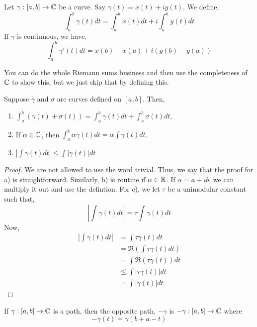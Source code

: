 \documentclass[12pt]{amsart}
\begin{document}
\begin{definition}
    Let $\gamma: [a, b] \to \mathbb C$ be a curve. Say $\gamma(t) = x(t)+iy(t)$. We define, 
    \[ \int_{a}^b \gamma(t)dt = \int_{a}^b x(t)dt + i\int_a^b y(t)dt\]    
    If $\gamma$ is continuous, we have, 
    \[ \int_{a}^b \gamma'(t)dt = x(b)-x(a) +i(y(b)-y(a))\]    
\end{definition}
\begin{remark}
    You can do the whole Riemann sums business and then use the completeness of $\mathbb C$ to show this, but we just skip that by defining this. 
\end{remark}

\begin{proposition}
    Suppose $\gamma$ and $\sigma$ are curves defined on $[a,b]$. Then, 
    \begin{enumerate}
        \item[a)] $\int_a^b (\gamma(t) + \sigma(t))  = \int_a^b \gamma(t)dt + \int_a^b \sigma(t)dt$.
        \item[b)] If $\alpha \in \mathbb C$, then $\int_a^b \alpha\gamma(t)dt = \alpha \int \gamma(t)dt$. 
        \item[c)] $\left| \int \gamma(t)dt\right|  \leq \int|\gamma(t)|dt$
    \end{enumerate}
\end{proposition}
\begin{proof}
    We are not allowed to use the word trivial. Thus, we say that the proof for a) is straightforward. Similarly, b) is routine if $\alpha \in \mathbb R$. If $\alpha = a+ib$, we can multiply it out and use the defintion. For c), we let $\tau$ be a unimodular constant such that,
    \[ |\int \gamma(t)dt| = \tau \int \gamma(t)dt \]
    Now, 
    \begin{align*}
        \left|\int \gamma(t) dt \right| &= \int \tau \gamma(t)dt \\
        &= \Re( \int \tau \gamma(t)dt) \\ 
        &= \int \Re(\tau\gamma(t))dt \\
        &\leq \int |\tau\gamma(t)|dt \\
        &= \int |\gamma(t)| dt
    \end{align*}
\end{proof}

\begin{definition}
    If $\gamma: [a,b] \to \mathbb C$ is a path, then the opposite path, $-\gamma$ is $-\gamma: [a,b] \to \mathbb C$ where 
    \[ -\gamma(t) = \gamma(b+a-t) \]
\end{definition}
\end{document}

